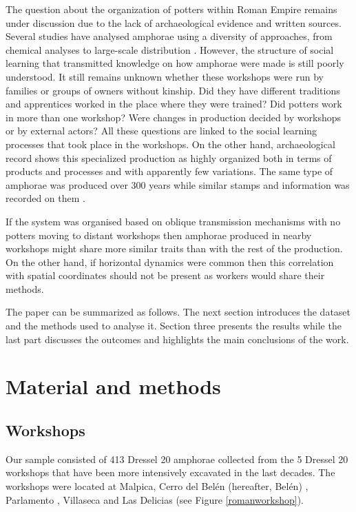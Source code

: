 \documentclass[review]{elsarticle}
\begin{document}
The question about the organization of potters within Roman Empire remains under discussion due to the lack of archaeological evidence and written sources. Several studies have analysed amphorae using a diversity of approaches, from chemical analyses to large-scale distribution \citep{isaksen_network_2006,brughmans_roman_2016,coto-sarmiento_maria_bayesian_????}. However, the structure of social learning that transmitted knowledge on how amphorae were made is still poorly understood. It still remains unknown whether these workshops were run by families or groups of owners without kinship. Did they have different traditions and apprentices worked in the place where they were trained? Did potters work in more than one workshop? Were changes in production decided by workshops or by external actors? All these questions are linked to the social learning processes that took place in the workshops. On the other hand, archaeological record shows this specialized production as highly organized both in terms of products and processes and with apparently few variations. The same type of amphorae was produced over 300 years while similar stamps and information was recorded on them \citep{remesal_anforas_2004}.

If the system was organised based on oblique transmission mechanisms with no potters moving to distant workshops then amphorae produced in nearby workshops might share more similar traits than with the rest of the production. On the other hand, if horizontal dynamics were common then this correlation with spatial coordinates should not be present as workers would share their methods.

The paper can be summarized as follows. The next section introduces the dataset and the methods used to analyse it. Section three presents the results while the last part discusses the outcomes and highlights the main conclusions of the work. 

\section{Material and methods}

\subsection{Workshops}

Our sample consisted of 413 Dressel 20 amphorae collected from the 5 Dressel 20 workshops that have been more intensively excavated in the last decades. The workshops were located at Malpica, Cerro del Belén (hereafter, Belén) \citep{diaz_trujillo_excavacion_1992}, Parlamento \citep{garcia_vargas_anforas_2000}, Villaseca \citep{garcia_vargas_enrique_excavacion_????} and Las Delicias \citep{fernandez_excavacion_2001,_atelier_2014} (see Figure \ref{romanworkshop}).
\end{document}
